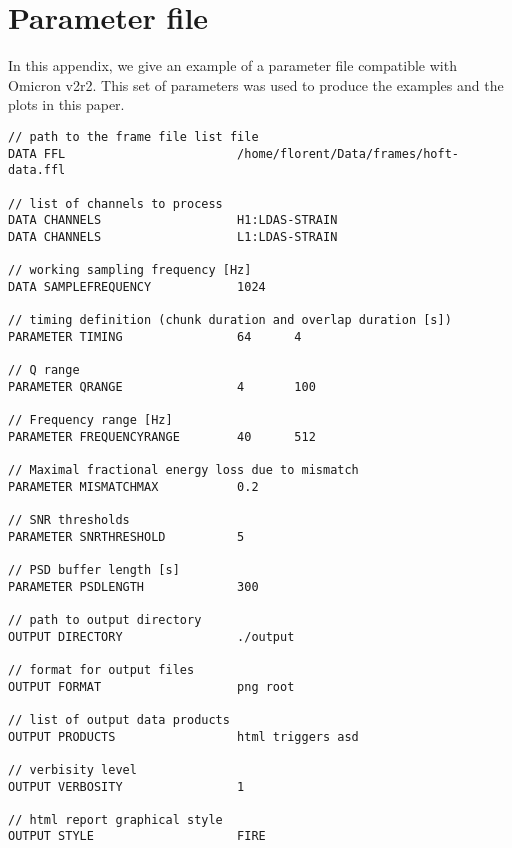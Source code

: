 \appendix
\section{Parameter file}\label{appx:parameters}
In this appendix, we give an example of a parameter file compatible with Omicron v2r2. This set of parameters was used to produce the examples and the plots in this paper.

\begin{verbatim}
// path to the frame file list file
DATA FFL                        /home/florent/Data/frames/hoft-data.ffl

// list of channels to process
DATA CHANNELS                   H1:LDAS-STRAIN
DATA CHANNELS                   L1:LDAS-STRAIN

// working sampling frequency [Hz]
DATA SAMPLEFREQUENCY            1024

// timing definition (chunk duration and overlap duration [s])
PARAMETER TIMING                64      4

// Q range
PARAMETER QRANGE                4       100

// Frequency range [Hz]
PARAMETER FREQUENCYRANGE        40      512

// Maximal fractional energy loss due to mismatch
PARAMETER MISMATCHMAX           0.2

// SNR thresholds
PARAMETER SNRTHRESHOLD          5

// PSD buffer length [s]
PARAMETER PSDLENGTH             300

// path to output directory
OUTPUT DIRECTORY                ./output

// format for output files
OUTPUT FORMAT                   png root

// list of output data products
OUTPUT PRODUCTS                 html triggers asd

// verbisity level
OUTPUT VERBOSITY                1

// html report graphical style
OUTPUT STYLE                    FIRE
\end{verbatim}
